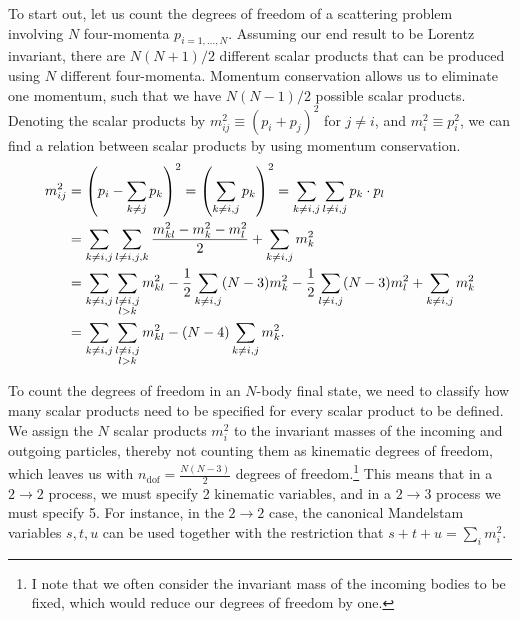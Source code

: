 \documentclass[../main.tex]{subfiles}
\begin{document}
To start out, let us count the degrees
of freedom of a scattering problem involving \(N\) four-momenta
\(p_{i=1,\ldots,N}\).
Assuming our end result to be Lorentz invariant, there are \(N(N+1)/2\) different scalar products that can be produced using \(N\) different four-momenta.
Momentum conservation allows us to eliminate one momentum, such that we have \(N(N-1)/2\) possible scalar products.
Denoting the scalar products by \(m^2_{ij} \equiv (p_i + p_j)^2\) for \(j \neq i\), and \(m^2_i \equiv p_i^2\), we can find a relation between scalar products by using momentum conservation.
\begin{align}
  \label{part:eq:generalised_mandelstam_relation}
  \nonumber
  m^2_{ij} & = \left(p_i - \sum_{k\neq j} p_k\right)^2 =
  \left(\sum_{k\neq i,j} p_k\right)^2 = \sum_{k\neq i,j} \sum_{l\neq i,j}
  p_k\cdot
  p_l
  \\
  \nonumber
           & = \sum_{k\neq i,j} \sum_{l\neq i,j,k} \frac{m^2_{kl} - m^2_k
  - m^2_l}{2} + \sum_{k\neq i,j} m^2_k
  \\
  \nonumber
           & = \sum_{k\neq i,j} \sum_{\substack{l\neq i,j
  \\l>k}} m^2_{kl}
  - \frac{1}{2} \sum_{k\neq i, j} (N-3) m^2_k - \frac{1}{2} \sum_{l\neq
    i,j}
  (N-3) m^2_l + \sum_{k\neq i,j} m^2_k
  \\
           & = \sum_{k\neq i,j} \sum_{\substack{l\neq i,j
  \\l>k}} m^2_{kl}
  - (N-4) \sum_{k\neq i, j} m^2_k.
\end{align}

To count the degrees of freedom in an \(N\)-body final state, we need to classify how many scalar products need to be specified for every scalar product to be defined.
We assign the \(N\) scalar products \(m^2_i\) to the invariant masses of the incoming and outgoing particles, thereby not counting them as kinematic degrees of freedom, which leaves us with \(n_\text{dof} = \frac{N(N-3)}{2}\) degrees of freedom.\footnote{I note that we
  often consider the invariant mass of the incoming bodies to be fixed, which would reduce our degrees of freedom by one.}
This means that in a \(2\to 2\) process, we must specify 2 kinematic variables, and in a \(2\to 3\) process we must specify 5.
For instance, in the \(2\to 2\) case, the canonical Mandelstam variables \(s, t, u\) can be used together with the restriction that \(s+t+u = \sum_i m_i^2\).
\end{document}
